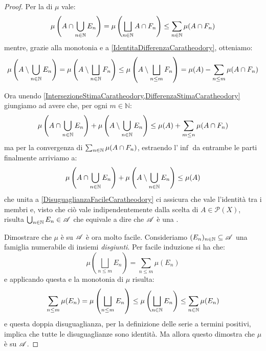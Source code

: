 \begin{proof}
	Per la \sigsubadd[ità] di $\mu$ vale:
	\begin{equation}\label{IntersezioneStimaCaratheodory}
		\mu\left(A\cap\bigcup_{n\in\mathbb N} E_n\right)=\mu\left(\bigsqcup_{n\in\mathbb N} A\cap F_n\right)\le
		\sum_{n\in\mathbb N} \mu(A\cap F_n)
	\end{equation}
	mentre, grazie alla monotonia e a \cref{IdentitaDifferenzaCaratheodory}, otteniamo:
	\begin{equation}\label{DifferenzaStimaCaratheodory}
		\mu\left(A\setminus\bigcup_{n\in\mathbb N} E_n\right) = \mu\left(A\setminus\bigsqcup_{n\in\mathbb N} F_n\right) \le \mu\left(A\setminus\bigsqcup_{n\le m} F_n\right) = 
		\mu(A)-\sum_{n\le m}\mu(A\cap F_n)
	\end{equation}
	
	Ora unendo \cref{IntersezioneStimaCaratheodory,DifferenzaStimaCaratheodory} giungiamo ad avere che, per ogni $m\in\mathbb{N}$:
	\begin{equation*}
		\mu\left(A\cap\bigcup_{n\in\mathbb N} E_n\right)+\mu\left(A\setminus\bigcup_{n\in\mathbb N} E_n\right)\le
		\mu(A)+\sum_{m\le n}\mu(A\cap F_n) 
	\end{equation*}
	ma per la convergenza di $\sum_{n\in \mathbb N}\mu(A\cap F_n)$, estraendo l'$\inf$ da entrambe le parti finalmente arriviamo a:
	\begin{equation*}
		\mu\left(A\cap\bigcup_{n\in\mathbb N} E_n\right)+\mu\left(A\setminus\bigcup_{n\in\mathbb N} E_n\right)\le
		\mu(A)
	\end{equation*}
	che unita a \cref{DisuguaglianzaFacileCaratheodory} ci assicura che vale l'identità tra i membri e, visto che ciò vale indipendentemente dalla scelta di $A\in\mathcal P(X)$, risulta $\bigcup_{n\in\mathbb N}E_n\in\mathscr A$ che equivale a dire che $\mathscr A$ è una \sigalg{}.
	
	Dimostrare che $\mu$ è \sigadd{} su $\mathscr A$ è ora molto facile.
	Consideriamo $(E_n)_{n\in\mathbb N}\subseteq \mathscr A$ una famiglia numerabile di insiemi \emph{disgiunti}. Per facile induzione si ha che:
	\begin{equation*}
		\mu\left(\bigsqcup_{n\le m}E_n\right)=\sum_{n\le m} \mu(E_n)
	\end{equation*}
	e applicando questa e la monotonia di $\mu$ risulta:
	\begin{equation*}
		\sum_{n\le m} \mu(E_n)=\mu\left(\bigsqcup_{n\le m}E_n\right)\le
		\mu\left(\bigsqcup_{n\in\mathbb N}E_n\right)\le \sum_{n\in\mathbb N} \mu(E_n)
	\end{equation*}
	e questa doppia disuguaglianza, per la definizione delle serie a termini positivi, implica che tutte le disuguaglianze sono identità. Ma allora questo dimostra che $\mu$ è \sigadd{} su $\mathscr A$.
	

\end{proof}
